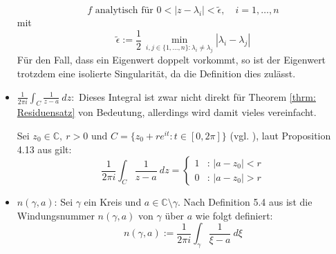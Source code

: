 \documentclass[a4paper,12pt]{report}
\newcommand{\C}{\mathbb C}
\newcommand{\1}{\mathds{1}}
\theoremstyle{plain} %
\theoremstyle{definition} %
\theoremstyle{remark}
\begin{document}
\begin{itemize}
                        \begin{equation}
                              \label{hilfe: complexAnalysis_isolierteSingularitäten}
                              f \text{ analytisch für } 0<|z-\lambda_i|<\widetilde{\epsilon},\quad i=1,\dots,n
                        \end{equation}
                        mit
                        $$\widetilde{\epsilon}:= \frac{1}{2}\,\min_{i,j\in\{1,\dots,n\}: \lambda_i\ne \lambda_j} |\lambda_i-\lambda_j|$$
                        Für den Fall, dass ein Eigenwert doppelt vorkommt, so ist der Eigenwert trotzdem eine isolierte Singularität, da die Definition dies zulässt.
                  \item $\frac{1}{2\pi i}\int_{C} \frac 1 {z-a}\ dz:$
                        Dieses Integral ist zwar nicht direkt für Theorem \ref{thrm: Residuensatz} von Bedeutung, allerdings wird damit vieles vereinfacht.

                        Sei $z_0\in\C,\ r>0\text{ und }C=\{z_0+r e^{it}: t\in [0,2\pi]\}$ (vgl. \cite[S. 48]{complexAnalysis}), laut Proposition 4.13 aus \cite[S. 48]{complexAnalysis} gilt:
                        \begin{equation}
                              \label{hilfe: complexAnalysis_IntegralEinsDurchX}
                              \frac{1}{2\pi i}\int_C \frac 1 {z-a}\ dz = \begin{cases}
                                    1 & \text{: } |a-z_0|<r \\
                                    0 & \text{: } |a-z_0|>r
                                    \end{cases}
                        \end{equation}
                  \item $n(\gamma, a)$:
                        Sei $\gamma$ ein Kreis und $a\in \C\setminus \gamma$.
                        Nach Definition 5.4 aus \cite[S. 65]{complexAnalysis} ist die Windungsnummer $n(\gamma,a)$ von $\gamma$ über $a$ wie folgt definiert:
                        $$n(\gamma,a):= \frac{1}{2\pi i}\int_\gamma \frac{1}{\xi-a}\ d\xi$$


\end{itemize}
\end{document}
